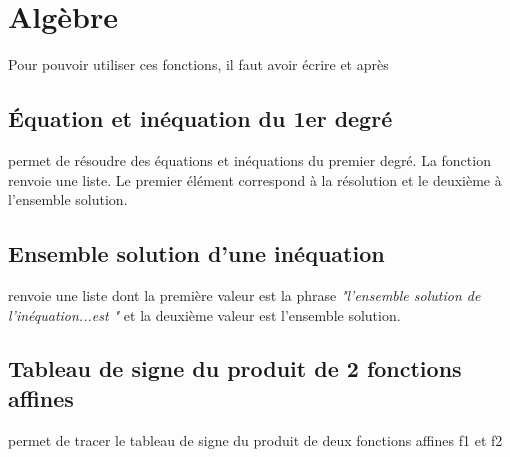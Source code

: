 





\maketitle
\enableopenany
\tableofcontents


\chapter{Algèbre}
Pour pouvoir utiliser ces fonctions, il faut avoir écrire \pyv{} et \pyv{} après \pyv{}
\section{Équation et inéquation du 1er degré}
 permet de résoudre des équations et inéquations du premier degré. La fonction renvoie une liste. Le premier élément correspond à la résolution et le deuxième à l'ensemble solution.
\section{Ensemble solution d'une inéquation}
 renvoie une liste dont la première valeur est la phrase \textit{"l'ensemble solution de l'inéquation...est "} et la deuxième valeur est l'ensemble solution.
 
\section{Tableau de signe du produit de 2 fonctions affines}
 permet de tracer le tableau de signe du produit de deux fonctions affines f1 et f2
